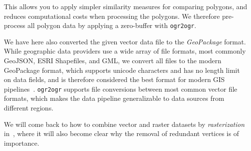 This allows you to apply simpler similarity measures for comparing polygons, and reduces computational costs when processing the polygons.
We therefore pre-process all polygon data by applying a zero-buffer with \texttt{ogr2ogr}.


We have here also converted the given vector data file to the \textit{GeoPackage} format.
While geographic data providers use a wide array of file formats, most commonly GeoJSON, ESRI Shapefiles, and GML, we convert all files to the modern GeoPackage format, which supports unicode characters and has no length limit on data fields, and is therefore considered the best format for modern GIS pipelines~\cite{hame_shapefile_2019}.
\texttt{ogr2ogr} supports file conversions between most common vector file formats, which makes the data pipeline generalizable to data sources from different regions.

We will come back to how to combine vector and raster datasets by \textit{rasterization} in~, where it will also become clear why the removal of redundant vertices is of importance.
